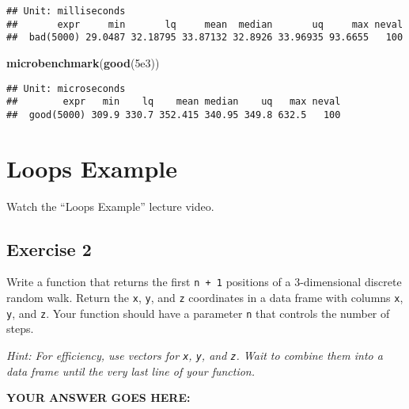 \documentclass[
]{article}
\newenvironment{Shaded}{\begin{snugshade}}{\end{snugshade}}
\newcommand{\FloatTok}[1]{\textcolor[rgb]{0.00,0.00,0.81}{#1}}
\newcommand{\KeywordTok}[1]{\textcolor[rgb]{0.13,0.29,0.53}{\textbf{#1}}}
\newcommand{\NormalTok}[1]{#1}
\begin{document}
\begin{verbatim}
## Unit: milliseconds
##       expr     min       lq     mean  median       uq     max neval
##  bad(5000) 29.0487 32.18795 33.87132 32.8926 33.96935 93.6655   100
\end{verbatim}

\begin{Shaded}
\begin{Highlighting}[]
\KeywordTok{microbenchmark}\NormalTok{(}\KeywordTok{good}\NormalTok{(}\FloatTok{5e3}\NormalTok{))}
\end{Highlighting}
\end{Shaded}

\begin{verbatim}
## Unit: microseconds
##        expr   min    lq    mean median    uq   max neval
##  good(5000) 309.9 330.7 352.415 340.95 349.8 632.5   100
\end{verbatim}

\hypertarget{loops-example}{%
\section{Loops Example}\label{loops-example}}

Watch the ``Loops Example'' lecture video.

\hypertarget{exercise-2}{%
\subsection{Exercise 2}\label{exercise-2}}

Write a function that returns the first \texttt{n\ +\ 1} positions of a
3-dimensional discrete random walk. Return the \texttt{x}, \texttt{y},
and \texttt{z} coordinates in a data frame with columns \texttt{x},
\texttt{y}, and \texttt{z}. Your function should have a parameter
\texttt{n} that controls the number of steps.

\emph{Hint: For efficiency, use vectors for \texttt{x}, \texttt{y}, and
\texttt{z}. Wait to combine them into a data frame until the very last
line of your function.}

\textbf{YOUR ANSWER GOES HERE:}
\end{document}
